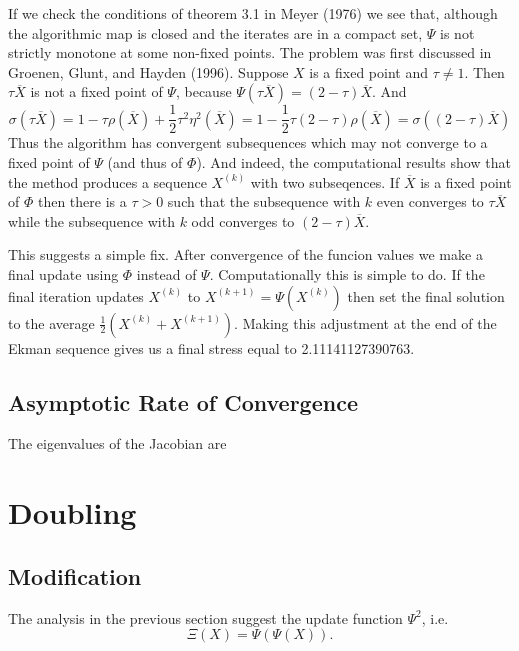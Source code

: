 \documentclass[
  12pt,
]{article}
\begin{document}
If we check the conditions of theorem 3.1 in Meyer (1976) we see that, although the
algorithmic map is closed and the iterates are in a compact set, \(\Psi\)
is not strictly monotone at some non-fixed points. The problem was first discussed
in Groenen, Glunt, and Hayden (1996). Suppose \(X\) is a fixed point and \(\tau\not= 1\). Then
\(\tau\overline{X}\) is not a fixed point of \(\Psi\), because
\(\Psi(\tau\overline{X})=(2-\tau)\overline{X}\). And
\begin{equation}
\sigma(\tau\overline{X})=1-\tau\rho(\overline{X})+\frac12\tau^2\eta^2(\overline{X})=
1-\frac12\tau(2-\tau)\rho(\overline{X})=\sigma((2-\tau)\overline{X})
\label{eq:sigmatau}
\end{equation}
Thus the algorithm has convergent subsequences which may not converge to a fixed
point of \(\Psi\) (and thus of \(\Phi\)). And indeed, the computational results show that the method produces a sequence \(X^{(k)}\) with two subseqences. If \(\overline{X}\) is a fixed point of \(\Phi\) then there is a \(\tau>0\) such that
the subsequence with \(k\) even converges to \(\tau\overline{X}\)
while the subsequence with \(k\) odd converges to \((2-\tau)\overline{X}\).

This suggests a simple fix. After convergence of the funcion values we make
a final update using \(\Phi\) instead of \(\Psi\). Computationally this is simple to do. If the final iteration updates \(X^{(k)}\) to \(X^{(k+1)}=\Psi(X^{(k)})\) then
set the final solution to the average \(\frac12(X^{(k)}+X^{(k+1)})\). Making this
adjustment at the end of the Ekman sequence gives us a final stress equal to 2.11141127390763.

\subsection{Asymptotic Rate of Convergence}\label{asymptotic-rate-of-convergence-4}

The eigenvalues of the Jacobian are

\section{Doubling}\label{doubling}

\subsection{Modification}\label{modification-4}

The analysis in the previous section suggest the update function \(\Psi^2\), i.e.
\[
\Xi(X)=\Psi(\Psi(X)).
\]
\end{document}
